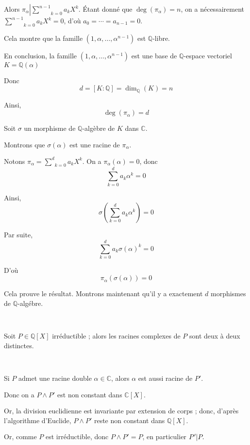 Alors $\pi_{\alpha} \left| \underset{k = 0}{\overset{n - 1}{\sum}} a_k X^k
\right.$. {\'E}tant donn{\'e} que $\deg (\pi_{\alpha}) = n$, on a
n{\'e}cessairement $\underset{k = 0}{\overset{n - 1}{\sum}} a_k X^k = 0$,
d'o{\`u} $a_0 = \cdots = a_{n - 1} = 0$.

Cela montre que la famille $(1, \alpha, \ldots, \alpha^{n - 1})$ est
$\mathbb{Q}$-libre.

En conclusion, la famille $(1, \alpha, \ldots, \alpha^{n - 1})$ est une base
de $\mathbb{Q}$-espace vectoriel $K =\mathbb{Q} (\alpha)$

Donc
\[ d = [K : \mathbb{Q}] = \dim_{\mathbb{Q}} (K) = n \]


Ainsi,
\[ \deg \left( {\pi_{\alpha}}  \right) = d \]


 Soit $\sigma$ un morphisme de $\mathbb{Q}$-alg{\`e}bre de $K$
dans $\mathbb{C}$.

Montrons que $\sigma (\alpha)$ est une racine de $\pi_{\alpha}$.

Notons $\pi_{\alpha} = \underset{k = 0}{\overset{d}{\sum}} a_k X^k$. On a
$\pi_{\alpha} (\alpha) = 0$, donc
\[ \underset{k = 0}{\overset{d}{\sum}} a_k \alpha^k = 0 \]


Ainsi,
\[ \sigma \left( \underset{k = 0}{\overset{d}{\sum}} a_k \alpha^k \right) = 0
\]


Par suite,
\[ \underset{k = 0}{\overset{d}{\sum}} a_k \sigma (\alpha)^k = 0 \]


D'o{\`u}
\[ \pi_{\alpha} (\sigma (\alpha)) = 0 \]


Cela prouve le r{\'e}sultat. Montrons maintenant qu'il y a exactement $d$
morphismes de $\mathbb{Q}$-alg{\'e}bre.

\


Soit $P \in \mathbb{Q} [X]$ irr{\'e}ductible ; alors les racines complexes de
$P$ sont deux {\`a} deux distinctes.

\


Si $P$ admet une racine double $\alpha \in \mathbb{C}$, alors $\alpha$ est
aussi racine de $P'$.

Donc on a $P \wedge P'$ est non constant dans $\mathbb{C} [X]$.

Or, la division euclidienne est invariante par extension de corps ; donc,
d'apr{\`e}s l'algorithme d'Euclide, $P \wedge P'$ reste non constant dans
$\mathbb{Q} [X]$.

Or, comme $P$ est irr{\'e}ductible, donc $P \wedge P' = P$, en particulier $P'
| P  .$

